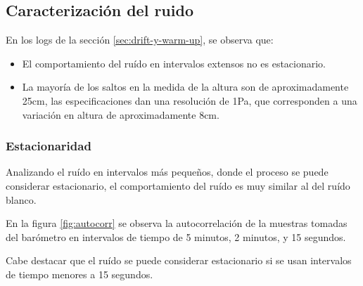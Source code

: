 \documentclass[spanish,12pt,a4paper,titlepage]{report}
\begin{document}
\newpage
\subsection{Caracterización del ruido}
\label{sec:caract-ruido}

En los logs de la sección \ref{sec:drift-y-warm-up}, se observa que:
\begin{itemize}
\item El comportamiento del ruído en intervalos extensos no es estacionario.
\item La mayoría de los saltos en la medida de la altura son de aproximadamente 25cm, las especificaciones dan una resolución de 1Pa, que corresponden a una variación en altura de aproximadamente 8cm.
\end{itemize}

\subsubsection{Estacionaridad}

Analizando el ruído en intervalos más pequeños, donde el proceso se puede considerar estacionario, el comportamiento del ruído es muy similar al del ruído blanco.

En la figura \ref{fig:autocorr} se observa la autocorrelación de la muestras tomadas del barómetro en intervalos de tiempo de 5 minutos, 2 minutos, y 15 segundos.

Cabe destacar que el ruído se puede considerar estacionario si se usan intervalos de tiempo menores a 15 segundos.
\end{document}
